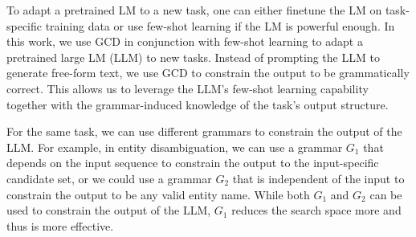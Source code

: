To adapt a pretrained LM to a new task, one can either finetune the LM on task-specific training data or use few-shot learning if the LM is powerful enough.
In this work, we use GCD in conjunction with few-shot learning to adapt a pretrained large LM (LLM) to new tasks.
Instead of prompting the LLM to generate free-form text, we use GCD to constrain the output to be grammatically correct.
This allows us to leverage the LLM's few-shot learning capability together with the grammar-induced knowledge of the task's output structure.

For the same task, we can use different grammars to constrain the output of the LLM.
For example, in entity disambiguation, we can use a grammar $G_1$ that depends on the input sequence to constrain the output to the input-specific candidate set, or we could use a grammar $G_2$ that is independent of the input to constrain the output to be any valid entity name.
While both $G_1$ and $G_2$ can be used to constrain the output of the LLM, $G_1$ reduces the search space more and thus is more effective.



